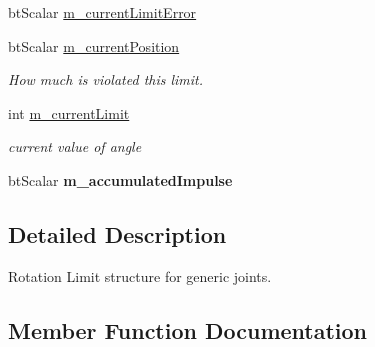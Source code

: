 \textbf{ }\par
\begin{DoxyCompactItemize}
\item 
bt\+Scalar \hyperlink{classbtRotationalLimitMotor_a7128feccb391176842f287b584e375d3}{m\+\_\+current\+Limit\+Error}
\item 
\mbox{\label{classbtRotationalLimitMotor_a1f334e324d5e337257c2b338e8e948de}} 
bt\+Scalar \hyperlink{classbtRotationalLimitMotor_a1f334e324d5e337257c2b338e8e948de}{m\+\_\+current\+Position}
\begin{DoxyCompactList}\small\item\em How much is violated this limit. \end{DoxyCompactList}\item 
int \hyperlink{classbtRotationalLimitMotor_ad1e4fa6cb3ea2e4b78c96feab97448e8}{m\+\_\+current\+Limit}
\begin{DoxyCompactList}\small\item\em current value of angle \end{DoxyCompactList}\item 
\mbox{\label{classbtRotationalLimitMotor_ac039866aac865fee30f5db25c0330c2f}} 
bt\+Scalar {\bfseries m\+\_\+accumulated\+Impulse}
\end{DoxyCompactItemize}



\subsection{Detailed Description}
Rotation Limit structure for generic joints. 

\subsection{Member Function Documentation}
\mbox{\label{classbtRotationalLimitMotor_ad52e9b1c402c7bdd47fb1a9de28afb7e}} 
